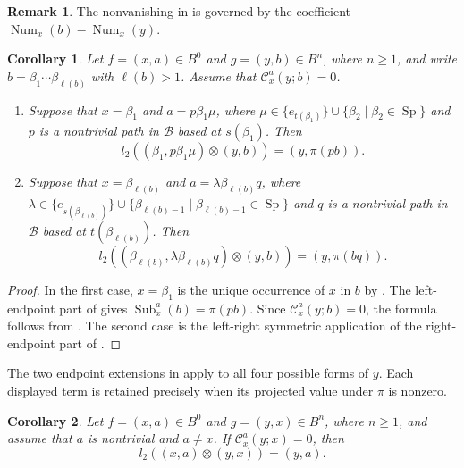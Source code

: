 \documentclass[11pt,a4paper,reqno]{amsart}
\newcommand{\mB}{\mathcal B}
\newcommand{\mC}{\mathcal C}
\newcommand{\Sub}{\operatorname{Sub}}
\newcommand{\Sp}{\operatorname{Sp}}
\newcommand{\para}[2]{(#1,#2)}
\newcommand{\num}[2]{\operatorname{Num}_{#1}(#2)}
\theoremstyle{plain}
\newtheorem{corollary}[corollary]{Corollary}
\theoremstyle{definition}
\newtheorem{remark}[remark]{Remark}
\numberwithin{equation}{section}
\begin{document}
	\begin{remark}\label{rem:mixed-identity-counting}
		The nonvanishing in  is governed by the coefficient
		$\num{x}{b}-\num{x}{y}$.
	\end{remark}
	
	\begin{corollary}
		\label{cor:mixed-endpoint-extension-general}
		Let $f=\para{x}{a}\in B^0$ and $g=\para{y}{b}\in B^n$, where $n\geq1$, and
		write $b=\beta_1\cdots\beta_{\ell(b)}$ with $\ell(b)>1$.
		Assume that $\mC_x^a(y;b)=0$.
		\begin{enumerate}
			\item Suppose that $x=\beta_1$ and
			$a=p\beta_1\mu$,
			where $\mu\in
			\{e_{t(\beta_1)}\}
			\cup
			\{\beta_2 \mid \beta_2\in\Sp\}$
			and $p$ is a nontrivial path in $\mB$ based at $s(\beta_1)$.  
			Then
			\[
			l_2(\para{\beta_1}{p\beta_1\mu}\otimes\para{y}{b})
			=
			\para{y}{\pi(pb)}.
			\]
			
			\item Suppose that $x=\beta_{\ell(b)}$ and
			$a=\lambda\beta_{\ell(b)}q$, where
			$\lambda\in
			\{e_{s(\beta_{\ell(b)})}\}
			\cup
			\{\beta_{\ell(b)-1} \mid \beta_{\ell(b)-1}\in\Sp\}$
			and $q$ is a nontrivial path in $\mB$ based at
			$t(\beta_{\ell(b)})$.  Then
			\[
			l_2(
			\para{\beta_{\ell(b)}}{\lambda\beta_{\ell(b)}q}
			\otimes\para{y}{b}
			)
			=
			\para{y}{\pi(bq)}.
			\]
		\end{enumerate}
	\end{corollary}
	
	\begin{proof}
		In the first case, $x=\beta_1$ is the unique occurrence of $x$ in $b$ by
		.  The left-endpoint part of
		 gives $\Sub_x^a(b)=\pi(pb)$.
		Since $\mC_x^a(y;b)=0$, the formula follows from .  The second
		case is the left-right symmetric application of the right-endpoint part of
		.
	\end{proof}
	
	The two endpoint extensions in 
	apply to all four possible forms of $y$.  Each displayed term is retained
	precisely when its projected value under $\pi$ is nonzero.
	
	\begin{corollary}\label{01-sub-only}
		Let $f=\para{x}{a}\in B^0$ and $g=\para{y}{x}\in B^n$, where
		$n\ge1$, and assume that $a$ is nontrivial and $a\neq x$.  If $\mC_x^a(y;x)=0$, then
		\[
		l_2(\para{x}{a}\otimes\para{y}{x})
		=
		\para{y}{a}.
		\]
	\end{corollary}
	
\end{document}
